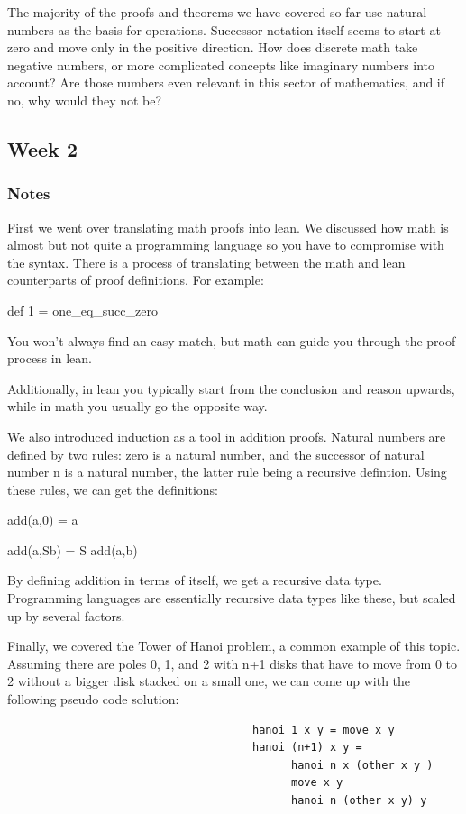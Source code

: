 \documentclass{article}
\theoremstyle{theorem}
\theoremstyle{definition}
\theoremstyle{remark}
\begin{document}
\hspace{0.65cm}The majority of the proofs and theorems we have covered so far use natural numbers as the basis for operations. Successor notation itself seems to start at zero and move only in the positive direction.
How does discrete math take negative numbers, or more complicated concepts like imaginary numbers into account? Are those numbers even relevant in this sector of mathematics, and if no, why would they not be?


\subsection{Week 2}

\subsubsection{Notes}

First we went over translating math proofs into lean. We discussed how math is almost but not quite a programming language 
so you have to compromise with the syntax. There is a process of translating between the math and lean counterparts of proof definitions.
For example:

\hspace{7cm}def 1 = one\_eq\_succ\_zero

You won't always find an easy match, but math can guide you through the proof process in lean. 

\hspace{0.65cm}Additionally, in lean you typically start from the conclusion and reason upwards, while in math you usually 
go the opposite way.

\hspace{0.65cm}We also introduced induction as a tool in addition proofs. Natural numbers are defined by two rules: zero is a natural number, and the successor of natural number n is a natural number, the latter rule being a recursive defintion.
Using these rules, we can get the definitions:

\hspace{7cm}add(a,0) = a

\hspace{7cm}add(a,Sb) = S add(a,b)

By defining addition in terms of itself, we get a recursive data type. Programming languages are essentially recursive data types like these, but scaled up by several factors.

\hspace{0.65cm}Finally, we covered the Tower of Hanoi problem, a common example of this topic. Assuming there are poles 0, 1, and 2 with n+1 disks that have to move from 0 to 2 without a bigger disk stacked on a small one,
we can come up with the following pseudo code solution: 
    \begin{verbatim}
                                      hanoi 1 x y = move x y
                                      hanoi (n+1) x y =
                                            hanoi n x (other x y )
                                            move x y 
                                            hanoi n (other x y) y
    \end{verbatim}
\end{document}
